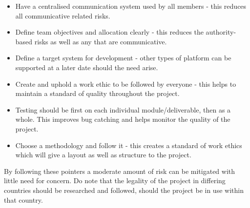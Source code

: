 \begin{itemize}
    \item Have a centralised communication system used by all members - this
          reduces all communicative related risks.
    \item Define team objectives and allocation clearly - this reduces the
          authority-based risks as well as any that are communicative.
    \item Define a target system for development - other types of platform can
          be supported at a later date should the need arise.
    \item Create and uphold a work ethic to be followed by everyone - this helps
          to maintain a standard of quality throughout the project.
    \item Testing should be first on each individual module/deliverable, then as
          a whole.  This improves bug catching and helps monitor the quality of
          the project.
    \item Choose a methodology and follow it - this creates a standard of work
          ethics which will give a layout as well as structure to the project.
\end{itemize}

By following these pointers a moderate amount of risk can be mitigated with
little need for concern.  Do note that the legality of the project in differing
countries should be researched and followed, should the project be in use within
that country.
